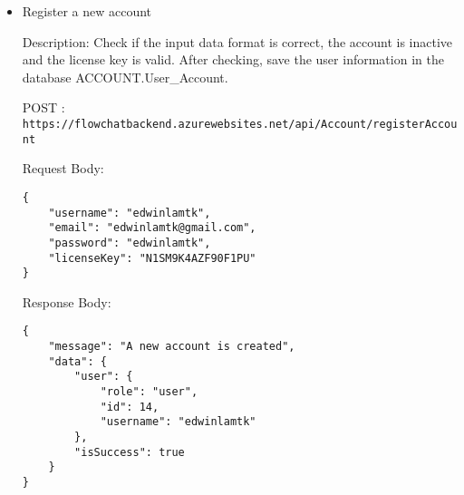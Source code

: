 \documentclass[11pt, a4paper]{article}
\begin{document}
\begin{itemize}
Request Body:
    \begin{lstlisting}[breaklines=true, frame=single]
{
    "email":"edwinlamtk@gmail.com"
}
    \end{lstlisting}

    Response Body:
    \begin{lstlisting}[breaklines=true, frame=single]
{
    "message": "A new license key is generated and sent",
    "data": {
        "isSuccess": true
    }
}
    \end{lstlisting}

\item Register a new account

Description: Check if the input data format is correct, the account is inactive and the license key is valid. After checking, save the user information in the database ACCOUNT.User\_Account.

POST :  \texttt{https://flowchatbackend.azurewebsites.net/api/Account/registerAccount}
    
Request Body:
    \begin{lstlisting}[breaklines=true, frame=single]
{
    "username": "edwinlamtk",
    "email": "edwinlamtk@gmail.com",
    "password": "edwinlamtk",
    "licenseKey": "N1SM9K4AZF90F1PU"
}
    \end{lstlisting}

    Response Body:
    \begin{lstlisting}[breaklines=true, frame=single]
{
    "message": "A new account is created",
    "data": {
        "user": {
            "role": "user",
            "id": 14,
            "username": "edwinlamtk"
        },
        "isSuccess": true
    }
}
    \end{lstlisting}

\end{itemize}
\end{document}

